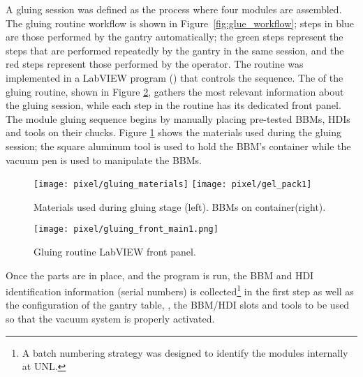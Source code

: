 A gluing session was defined as the process where four modules are assembled. The gluing routine workflow is shown in Figure~\ref{fig:glue_workflow}; steps in blue are those performed by the gantry automatically; the green steps represent the steps that are performed repeatedly by the gantry in the same session, and the red steps represent those performed by the operator. The routine was implemented in a LabVIEW program () that controls the sequence. The  of the gluing routine, shown in Figure \ref{fig:gluing_front_main}, gathers the most relevant information about the gluing session, while each step in the routine has its dedicated front panel. The module gluing sequence begins by manually placing pre-tested BBMs, HDIs and tools on their chucks. Figure \ref{fig:gluing_materials} shows the materials used during the gluing session; the square aluminum tool is used to hold the BBM's container while the vacuum pen is used to manipulate the BBMs.

\begin{figure}[h]
\begin{center}
  \texttt{[image: pixel/gluing\_materials]}
  \texttt{[image: pixel/gel\_pack1]}
 \caption[Materials used during gluing stage]{Materials used during gluing stage (left). BBMs on container(right).}\label{fig:gluing_materials}
\end{center}
\end{figure}

\begin{landscape}
\begin{figure}[h]
  \begin{center}
    \vspace{-2.5cm}
    \hspace{-1cm}
    \texttt{[image: pixel/gluing\_front\_main1.png]}
    \caption[Gluing routine LabVIEW front panel]{Gluing routine LabVIEW front panel.}\label{fig:gluing_front_main}
    \vspace{-2cm}
    \hspace{-2cm}
  \end{center}
\end{figure}
\end{landscape}


Once the parts are in place, and the program is run, the BBM and HDI identification information (serial numbers) is collected\footnote{A batch numbering strategy was designed to identify the modules internally at UNL.} in the first step as well as the configuration of the gantry table, \ie, the BBM/HDI slots and tools to be used so that the vacuum system is properly activated. 

